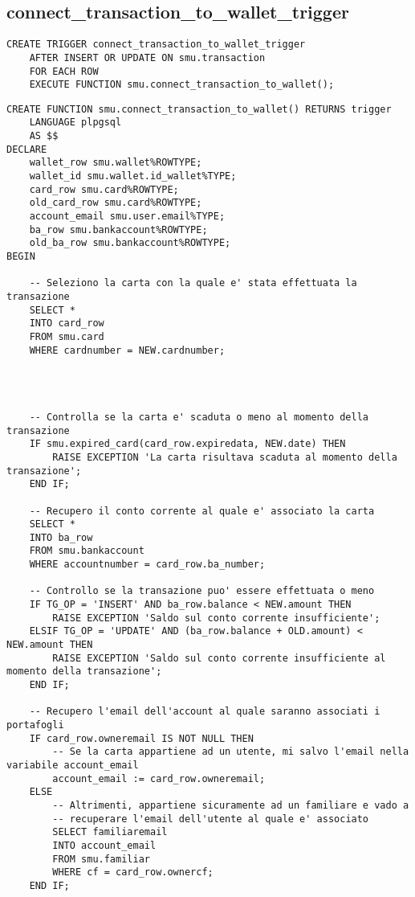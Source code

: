 \subsection{connect\_transaction\_to\_wallet\_trigger}

\begin{lstlisting}[tabsize=2]
    CREATE TRIGGER connect_transaction_to_wallet_trigger 
    AFTER INSERT OR UPDATE ON smu.transaction 
    FOR EACH ROW 
    EXECUTE FUNCTION smu.connect_transaction_to_wallet();
\end{lstlisting}

\begin{lstlisting}[tabsize=2]
    CREATE FUNCTION smu.connect_transaction_to_wallet() RETURNS trigger
    LANGUAGE plpgsql
    AS $$
DECLARE
    wallet_row smu.wallet%ROWTYPE;
    wallet_id smu.wallet.id_wallet%TYPE;
    card_row smu.card%ROWTYPE;
    old_card_row smu.card%ROWTYPE;
    account_email smu.user.email%TYPE;
    ba_row smu.bankaccount%ROWTYPE;
    old_ba_row smu.bankaccount%ROWTYPE;
BEGIN

    -- Seleziono la carta con la quale e' stata effettuata la transazione
    SELECT *
    INTO card_row
    FROM smu.card
    WHERE cardnumber = NEW.cardnumber;




    -- Controlla se la carta e' scaduta o meno al momento della transazione
    IF smu.expired_card(card_row.expiredata, NEW.date) THEN
        RAISE EXCEPTION 'La carta risultava scaduta al momento della transazione';
    END IF;

    -- Recupero il conto corrente al quale e' associato la carta
    SELECT *
    INTO ba_row
    FROM smu.bankaccount
    WHERE accountnumber = card_row.ba_number;
    
    -- Controllo se la transazione puo' essere effettuata o meno
    IF TG_OP = 'INSERT' AND ba_row.balance < NEW.amount THEN
        RAISE EXCEPTION 'Saldo sul conto corrente insufficiente';
    ELSIF TG_OP = 'UPDATE' AND (ba_row.balance + OLD.amount) < NEW.amount THEN
        RAISE EXCEPTION 'Saldo sul conto corrente insufficiente al momento della transazione';
    END IF;

    -- Recupero l'email dell'account al quale saranno associati i portafogli
    IF card_row.owneremail IS NOT NULL THEN
        -- Se la carta appartiene ad un utente, mi salvo l'email nella variabile account_email
        account_email := card_row.owneremail;
    ELSE
        -- Altrimenti, appartiene sicuramente ad un familiare e vado a
        -- recuperare l'email dell'utente al quale e' associato
        SELECT familiaremail
        INTO account_email
        FROM smu.familiar
        WHERE cf = card_row.ownercf;
    END IF;


\end{lstlisting}
